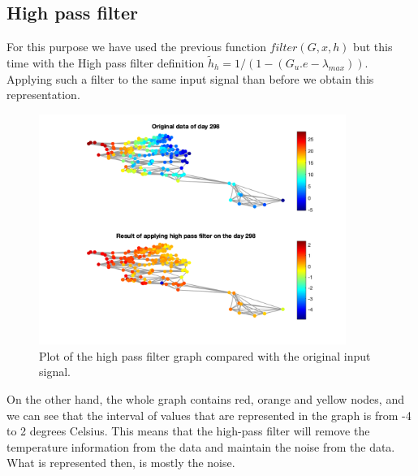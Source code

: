 \documentclass[12pt]{article}
\begin{document}
\subsection{High pass filter}
\justifying
For this purpose we have used the previous function $filter(G,x, h)$ but this time with the High pass filter definition $\tilde{h}_h= 1/(1-(G_u.e-\lambda_{max}))$. Applying such a filter to the same input signal than before we obtain this representation.
\begin{figure}[H]
	\centering
	\includegraphics[width=10cm]{images/6.png}
	\caption{Plot of the high pass filter graph compared with the original input signal.}
	\label{fig:lowpassfilterrandom}
\end{figure}
On the other hand, the whole graph contains  red, orange and yellow nodes, and we can see that the interval of values that are represented in the graph is from -4 to 2 degrees Celsius. This means that the high-pass filter will remove the temperature information from the data and maintain the noise from the data. What is represented then, is mostly the noise.
\end{document}

